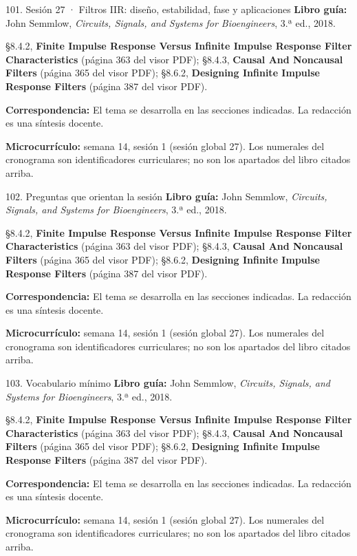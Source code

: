 \documentclass[
  10pt,
  ignorenonframetext,
  aspectratio=169,
  spanish,
]{beamer}
\begin{document}
\begin{frame}{101. Sesión 27 · Filtros IIR: diseño, estabilidad, fase y
aplicaciones}
\label{sesiuxf3n-27-filtros-iir-diseuxf1o-estabilidad-fase-y-aplicaciones}
\textbf{Libro guía:} John Semmlow, \emph{Circuits, Signals, and Systems
for Bioengineers}, 3.ª ed., 2018.

§8.4.2, \textbf{Finite Impulse Response Versus Infinite Impulse Response
Filter Characteristics} (página 363 del visor PDF); §8.4.3,
\textbf{Causal And Noncausal Filters} (página 365 del visor PDF);
§8.6.2, \textbf{Designing Infinite Impulse Response Filters} (página 387
del visor PDF).

\textbf{Correspondencia:} El tema se desarrolla en las secciones
indicadas. La redacción es una síntesis docente.

\textbf{Microcurrículo:} semana 14, sesión 1 (sesión global 27). Los
numerales del cronograma son identificadores curriculares; no son los
apartados del libro citados arriba.
\end{frame}

\begin{frame}{102. Preguntas que orientan la sesión}
\label{preguntas-que-orientan-la-sesiuxf3n-6}
\textbf{Libro guía:} John Semmlow, \emph{Circuits, Signals, and Systems
for Bioengineers}, 3.ª ed., 2018.

§8.4.2, \textbf{Finite Impulse Response Versus Infinite Impulse Response
Filter Characteristics} (página 363 del visor PDF); §8.4.3,
\textbf{Causal And Noncausal Filters} (página 365 del visor PDF);
§8.6.2, \textbf{Designing Infinite Impulse Response Filters} (página 387
del visor PDF).

\textbf{Correspondencia:} El tema se desarrolla en las secciones
indicadas. La redacción es una síntesis docente.

\textbf{Microcurrículo:} semana 14, sesión 1 (sesión global 27). Los
numerales del cronograma son identificadores curriculares; no son los
apartados del libro citados arriba.
\end{frame}

\begin{frame}{103. Vocabulario mínimo}
\label{vocabulario-muxednimo-6}
\textbf{Libro guía:} John Semmlow, \emph{Circuits, Signals, and Systems
for Bioengineers}, 3.ª ed., 2018.

§8.4.2, \textbf{Finite Impulse Response Versus Infinite Impulse Response
Filter Characteristics} (página 363 del visor PDF); §8.4.3,
\textbf{Causal And Noncausal Filters} (página 365 del visor PDF);
§8.6.2, \textbf{Designing Infinite Impulse Response Filters} (página 387
del visor PDF).

\textbf{Correspondencia:} El tema se desarrolla en las secciones
indicadas. La redacción es una síntesis docente.

\textbf{Microcurrículo:} semana 14, sesión 1 (sesión global 27). Los
numerales del cronograma son identificadores curriculares; no son los
apartados del libro citados arriba.
\end{frame}
\end{document}
